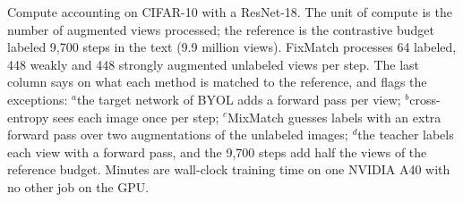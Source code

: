 \begin{table}[t]
\centering
\small
\caption{Compute accounting on CIFAR-10 with a ResNet-18. The unit of compute is the number of augmented
views processed; the reference is the contrastive budget labeled 9,700 steps in the text (9.9 million views).
FixMatch processes 64 labeled, 448 weakly and 448 strongly augmented unlabeled views per step. The last
column says on what each method is matched to the reference, and flags the exceptions: $^a$the target network
of BYOL adds a forward pass per view; $^b$cross-entropy sees each image once per step; $^c$MixMatch guesses
labels with an extra forward pass over two augmentations of the unlabeled images; $^d$the teacher labels each
view with a forward pass, and the 9,700 steps add half the views of the reference budget. Minutes are
wall-clock training time on one NVIDIA A40 with no other job on the GPU.}
\label{tab:compute}
\begin{adjustbox}{max width=\linewidth}

\end{adjustbox}
\end{table}

